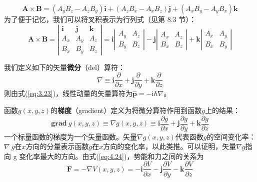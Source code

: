     \begin{equation*}
        \mathbf{A}\times\mathbf{B} = \left(A_yB_z - A_zB_y\right)\mathbf{i} + \left(A_zB_x - A_xB_z\right)\mathbf{j} + \left(A_xB_y - A_yB_x\right)\mathbf{k}
    \end{equation*}
    为了便于记忆，我们可以将叉积表示为行列式（见第 8.3 节）：
    \begin{equation}
        \mathbf{A}\times\mathbf{B} = \left|
            \begin{array}{ccc}
            \mathbf{i} & \mathbf{j} & \mathbf{k} \\
            A_x & A_y & A_z \\
            B_x & B_y & B_z
            \end{array}
        \right| = \mathbf{i}\left|
            \begin{array}{ccc}
            A_y & A_z \\
            B_y & B_z
            \end{array}
        \right| - \mathbf{j}\left|
            \begin{array}{ccc}
            A_x & A_z \\
            B_x & B_z
            \end{array}
        \right| + \mathbf{k}\left|
            \begin{array}{ccc}
            A_x & A_y \\
            B_x & B_y
            \end{array}
        \right|
        \label{eq:5.28}
    \end{equation}

    我们定义如下的矢量\textbf{微分}（del）算符：
    \begin{equation}
        \boxed{
            \nabla \equiv \mathbf{i}\frac{\partial}{\partial x} + \mathbf{j}\frac{\partial}{\partial y} + \mathbf{k}\frac{\partial}{\partial z}
        }
        \label{eq:5.29}
    \end{equation}
    则由式(\ref{eq:3.23})，线性动量的矢量算符为$\hat{\mathbf{p}}=-\mathrm{i}\hbar\nabla$。

    函数$g\left(x,y,z\right)$的\textbf{梯度}（gradient）定义为将微分算符作用到函数$g$上的结果：
    \begin{equation}
        \boxed{
            \mathbf{grad} \: g\left(x,y,z\right) \equiv \nabla g\left(x,y,z\right) \equiv \mathbf{i}\frac{\partial g}{\partial x} + \mathbf{j}\frac{\partial g}{\partial y} + \mathbf{k}\frac{\partial g}{\partial z}
        }
        \label{eq:5.30}
    \end{equation}
    一个标量函数的梯度为一个矢量函数。矢量$\nabla g\left(x,y,z\right)$代表函数$g$的空间变化率：$\nabla \:g$在$x$方向的分量表示函数$g$在$x$方向的变化率，以此类推。可以证明，矢量$\nabla g$指向 g 变化率最大的方向。由式(\ref{eq:4.24})，势能和力之间的关系为
    \begin{equation}
        \mathbf{F} = -\nabla V\left(x,y,z\right) = -\mathbf{i}\frac{\partial V}{\partial x} - \mathbf{j}\frac{\partial V}{\partial y} - \mathbf{k}\frac{\partial V}{\partial z}
        \label{eq:5.31}
    \end{equation}

